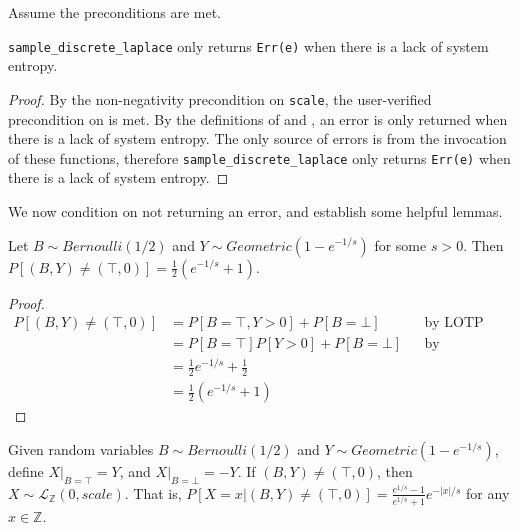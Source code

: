 \documentclass{article}
\begin{document}
Assume the preconditions are met. 
 
\begin{lemma} 
    \label{err-e} 
    \texttt{sample\_discrete\_laplace} only returns \texttt{Err(e)} when there is a lack of system entropy. 
\end{lemma} 
 
\begin{proof} 
    By the non-negativity precondition on \texttt{scale},
    the user-verified precondition on  is met. 
    By the definitions of  and ,  
    an error is only returned when there is a lack of system entropy. 
    The only source of errors is from the invocation of these functions, 
    therefore \texttt{sample\_discrete\_laplace} only returns \texttt{Err(e)} when there is a lack of system entropy. 
\end{proof} 
 
We now condition on not returning an error, and establish some helpful lemmas. 
\begin{lemma}\cite{CKS20}\label{P_B_Y_ne_T_0} 
    Let $B \sim Bernoulli(1/2)$ and $Y \sim Geometric(1 - e^{-1/s})$ for some $s > 0$.  
    Then $P[(B, Y) \neq (\top, 0)] = \frac{1}{2} (e^{-1/s} + 1)$. 
\end{lemma} 
 
\begin{proof} 
    \begin{align*} 
        P[(B, Y) \neq (\top, 0)] &= P[B = \top, Y > 0] + P[B = \bot] && \text{by LOTP} \\ 
        &= P[B = \top] P[Y > 0] + P[B = \bot] && \text{by independence of B, Y} \\ 
        &= \frac{1}{2} e^{-1/s} + \frac{1}{2} \\ 
        &= \frac{1}{2} (e^{-1/s} + 1) 
    \end{align*} 
\end{proof} 
 
\begin{lemma}\cite{CKS20}\label{P_Lx_BY_ne_T0} 
    Given random variables $B \sim Bernoulli(1/2)$ and $Y \sim Geometric(1 - e^{-1/s})$, define $X|_{B=\top} = Y$, and $X|_{B=\bot} = -Y$.  
    If $(B, Y) \neq (\top, 0)$, then $X \sim \mathcal{L}_\mathbb{Z}(0, scale)$.  
    That is, $P[X = x | (B, Y) \neq (\top, 0)] = \frac{e^{1/s} - 1}{e^{1/s} + 1} e^{-|x|/s}$ for any $x \in \mathbb{Z}$. 
\end{lemma} 
 
\end{document}
